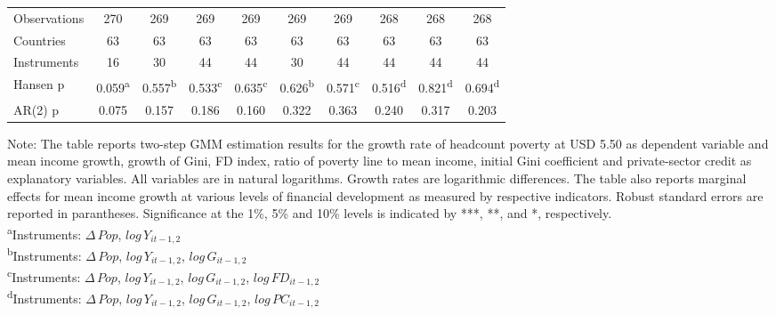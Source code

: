 \documentclass[12pt, a4paper]{article}
\begin{document}
\begin{table}[htbp]
\begin{threeparttable}
{\begin{tabular}{l*{9}{c}}
				\hline
				Observations        &         270         &         269         &         269         &         269         &         269         &         269         &         268         &         268         &         268         \\
				Countries           &          63         &          63         &          63         &          63         &          63         &          63         &          63         &          63         &          63         \\
				Instruments         &          16         &          30         &          44         &          44         &          30         &          44         &          44         &          44         &          44         \\
				Hansen p         &       0.059\textsuperscript{a}         &       0.557\textsuperscript{b}         &       0.533\textsuperscript{c}         &       0.635\textsuperscript{c}         &       0.626\textsuperscript{b}         &       0.571\textsuperscript{c}         &       0.516\textsuperscript{d}         &       0.821\textsuperscript{d}         &       0.694\textsuperscript{d}         \\
				AR(2) p               &       0.075         &       0.157         &       0.186         &       0.160         &       0.322         &       0.363         &       0.240         &       0.317         &       0.203         \\
				\hline\hline
			\end{tabular}
		}
		\begin{tablenotes}
			\item \scriptsize{Note: The table reports two-step GMM estimation results for the growth rate of headcount poverty at USD 5.50 as dependent variable and mean income growth, growth of Gini, FD index, ratio of poverty line to mean income, initial Gini coefficient and private-sector credit as explanatory variables. All variables are in natural logarithms. Growth rates are logarithmic differences. The table also reports marginal effects for mean income growth at various levels of financial development as measured by respective indicators. Robust standard errors are reported in parantheses. Significance at the 1\%, 5\% and 10\% levels is indicated by ***, **, and *, respectively.\\
				\textsuperscript{a}Instruments: $\Delta \, Pop$, $log \, Y_{it-1,2}$}\\
			\textsuperscript{b}Instruments: $\Delta \, Pop$, $log \, Y_{it-1,2}$, $log \, G_{it-1,2}$\\
			\textsuperscript{c}Instruments: $\Delta \, Pop$, $log \, Y_{it-1,2}$, $log \, G_{it-1,2}$, $log \, FD_{it-1,2}$\\
			\textsuperscript{d}Instruments: $\Delta \, Pop$, $log \, Y_{it-1,2}$, $log \, G_{it-1,2}$, $log \, PC_{it-1,2}$\\
			

\end{tablenotes}
\end{threeparttable}
\end{table}
\end{document}
